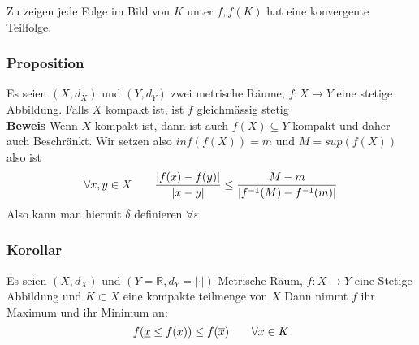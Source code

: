 \documentclass{article}
\newcommand{\mspc}{\hspace{0.7cm}}
\newcommand{\korollar}[1]{\subsubsection*{Korollar {#1}}}
\newcommand{\beweis}{\\\textbf{Beweis }}
\newcommand{\proposition}[1]{\subsubsection*{Proposition {#1}}}
\begin{document}
Zu zeigen jede Folge im Bild von $K$ unter $f,f(K)$ hat eine konvergente Teilfolge.
\proposition{} Es seien $(X,d_X)$ und $(Y,d_Y)$ zwei metrische Räume, $f:X\rightarrow Y$ eine stetige Abbildung. Falls $X$ kompakt ist, ist $f$ gleichmässig stetig
\beweis Wenn $X$ kompakt ist, dann ist auch $f(X)\subseteq Y$ kompakt und daher auch Beschränkt. Wir setzen also $inf(f(X))=m$ und $M=sup(f(X))$ also ist \[\forall x,y\in X\mspc\frac{|f(x)-f(y)|}{|x-y|}\le\frac{M-m}{|f^{-1}(M)-f^{-1}(m)|}\] 
Also kann man hiermit $\delta$ definieren $\forall \varepsilon$
\korollar{} Es seien $(X, d_X)$ und $(Y=\mathbb{R}, d_Y=|\cdot|)$ Metrische Räum, $f:X\rightarrow Y$ eine Stetige Abbildung und $K\subset X$ eine kompakte teilmenge von $X$ 
Dann nimmt $f$ ihr Maximum und ihr Minimum an:
\[f(\underline{x}\le f(x))\le f(\overline{x}) \mspc \forall x \in K\]
\end{document}
